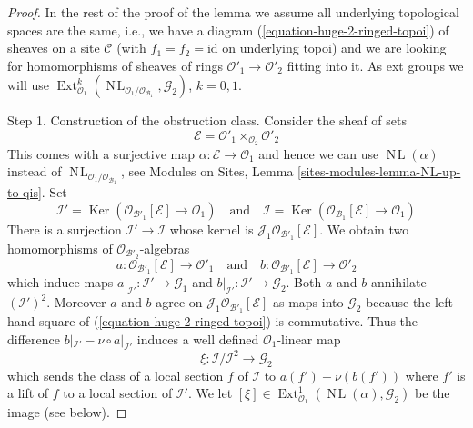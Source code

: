 \documentclass{stacks-project}
\theoremstyle{plain}
\theoremstyle{definition}
\theoremstyle{remark}
\numberwithin{equation}{subsection}
\def\Ext{\mathop{\mathrm{Ext}}\nolimits}
\def\NL{\mathop{N\!L}\nolimits}
\def\Ker{\mathop{\mathrm{Ker}}}
\begin{document}
\begin{proof}
\medskip\noindent
In the rest of the proof of the lemma we assume
all underlying topological spaces are the
same, i.e., we have a diagram (\ref{equation-huge-2-ringed-topoi})
of sheaves on a site $\mathcal{C}$ (with $f_1 = f_2 = \text{id}$
on underlying topoi) and we are looking for
homomorphisms of sheaves of rings
$\mathcal{O}'_1 \to \mathcal{O}'_2$ fitting into it.
As ext groups we will use
$\Ext^k_{\mathcal{O}_1}(
\NL_{\mathcal{O}_1/\mathcal{O}_{\mathcal{B}_1}}, \mathcal{G}_2)$, $k = 0, 1$.

\medskip\noindent
Step 1. Construction of the obstruction class. Consider the sheaf
of sets
$$
\mathcal{E} = \mathcal{O}'_1 \times_{\mathcal{O}_2} \mathcal{O}'_2
$$
This comes with a surjective map $\alpha : \mathcal{E} \to \mathcal{O}_1$
and hence we can use $\NL(\alpha)$ instead of
$\NL_{\mathcal{O}_1/\mathcal{O}_{\mathcal{B}_1}}$, see
Modules on Sites, Lemma \ref{sites-modules-lemma-NL-up-to-qis}.
Set
$$
\mathcal{I}' =
\Ker(\mathcal{O}_{\mathcal{B}'_1}[\mathcal{E}] \to \mathcal{O}_1)
\quad\text{and}\quad
\mathcal{I} =
\Ker(\mathcal{O}_{\mathcal{B}_1}[\mathcal{E}] \to \mathcal{O}_1)
$$
There is a surjection $\mathcal{I}' \to \mathcal{I}$ whose kernel
is $\mathcal{J}_1\mathcal{O}_{\mathcal{B}'_1}[\mathcal{E}]$.
We obtain two homomorphisms of $\mathcal{O}_{\mathcal{B}'_2}$-algebras
$$
a : \mathcal{O}_{\mathcal{B}'_1}[\mathcal{E}] \to \mathcal{O}'_1
\quad\text{and}\quad
b : \mathcal{O}_{\mathcal{B}'_1}[\mathcal{E}] \to \mathcal{O}'_2
$$
which induce maps $a|_{\mathcal{I}'} : \mathcal{I}' \to \mathcal{G}_1$ and
$b|_{\mathcal{I}'} : \mathcal{I}' \to \mathcal{G}_2$. Both $a$ and $b$
annihilate $(\mathcal{I}')^2$. Moreover $a$ and $b$ agree on
$\mathcal{J}_1\mathcal{O}_{\mathcal{B}'_1}[\mathcal{E}]$
as maps into $\mathcal{G}_2$
because the left hand square of (\ref{equation-huge-2-ringed-topoi})
is commutative. Thus the difference
$b|_{\mathcal{I}'} - \nu \circ a|_{\mathcal{I}'}$
induces a well defined $\mathcal{O}_1$-linear map
$$
\xi : \mathcal{I}/\mathcal{I}^2 \longrightarrow \mathcal{G}_2
$$
which sends the class of a local section $f$ of $\mathcal{I}$ to
$a(f') - \nu(b(f'))$ where $f'$ is a lift of $f$ to a local
section of $\mathcal{I}'$. We let
$[\xi] \in \Ext^1_{\mathcal{O}_1}(\NL(\alpha), \mathcal{G}_2)$
be the image (see below).


\end{proof}
\end{document}

